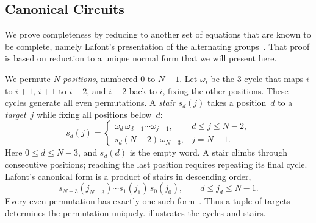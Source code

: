 \documentclass[acmsmall,screen,nonacm]{acmart}
\begin{document}
\subsection{Canonical Circuits}

We prove completeness by reducing to another set of equations that are known to be complete,
namely Lafont's presentation of the alternating groups~\cite{lafont2003boolean}.
That proof is based on reduction to a unique normal form that we will present here.

We permute $N$ \emph{positions}, numbered 0 to $N-1$.
Let $\omega_i$ be the $3$-cycle that maps $i$ to $i+1$, $i+1$ to $i+2$, and $i+2$ back
to $i$, fixing the other positions. These cycles generate all even
permutations. A \emph{stair} $s_d(j)$ takes a position~$d$ to a
\emph{target}~$j$ while fixing all positions below~$d$:
\[
s_d(j)=
\begin{cases}
\omega_d\,\omega_{d+1}\cdots\omega_{j-1},
  & d\le j\le N-2,\\
s_d(N-2)\,\omega_{N-3}, & j=N-1.
\end{cases}
\]
Here $0\le d\le N-3$, and $s_d(d)$ is the empty word.
A stair climbs through consecutive positions; reaching the last position
requires repeating its final cycle.
Lafont's canonical form is a product of stairs in descending order,
\[
s_{N-3}(j_{N-3})\cdots s_1(j_1)\,s_0(j_0),
\qquad d\le j_d\le N-1.
\]
Every even permutation has exactly one such form~\cite[Lemma~6]{lafont2003boolean}.
Thus a tuple of targets determines the permutation uniquely.
 illustrates the cycles and stairs.
\end{document}
